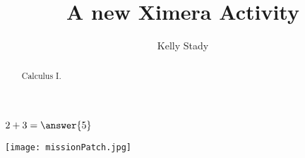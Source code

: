 \documentclass[handout]{ximera}
\title{A new Ximera Activity}
\author{Kelly Stady}
\begin{document}
\begin{abstract}
    Calculus I.
\end{abstract}
\maketitle


\begin{exercise}
    $2+3=\answer{5}$
\end{exercise}

\begin{center} %
\texttt{[image: missionPatch.jpg]}
\end{center}
\end{document}
